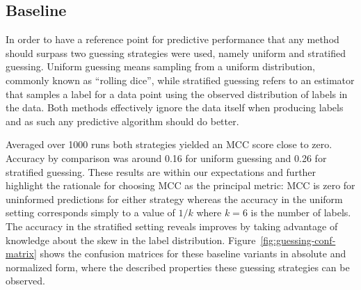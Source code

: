 \subsection{Baseline}
\label{sub:Baseline}

In order to have a reference point for predictive performance that any method should surpass two guessing strategies were used, namely uniform and stratified guessing. Uniform guessing means sampling from a uniform distribution, commonly known as ``rolling dice'', while stratified guessing refers to an estimator that samples a label for a data point using the observed distribution of labels in the data. Both methods effectively ignore the data itself when producing labels and as such any predictive algorithm should do better.

Averaged over 1000 runs both strategies yielded an \gls{MCC} score close to zero. Accuracy by comparison was around 0.16 for uniform guessing and 0.26 for stratified guessing. These results are within our expectations and further highlight the rationale for choosing \gls{MCC} as the principal metric: \gls{MCC} is zero for uninformed predictions for either strategy whereas the accuracy in the uniform setting corresponds simply to a value of $1/k$ where $k = 6$ is the number of labels. The accuracy in the stratified setting reveals improves by taking advantage of knowledge about the skew in the label distribution. Figure~\ref{fig:guessing-conf-matrix} shows the confusion matrices for these baseline variants in absolute and normalized form, where the described properties these guessing strategies can be observed.

